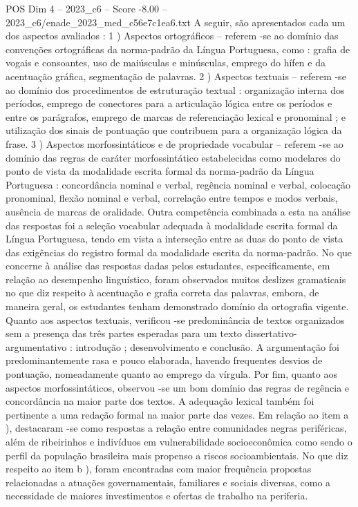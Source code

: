 \begin{textsample}{POS Dim 4 – 2023\_c6 – Score -8.00 – 2023\_c6/enade\_2023\_med\_c56e7c1ea6.txt}
A seguir, são apresentados cada um dos aspectos avaliados : 1 ) Aspectos ortográficos – referem -se ao domínio das convenções ortográficas da norma-padrão da Língua Portuguesa, como : grafia de vogais e consoantes, uso de maiúsculas e minúsculas, emprego do hífen e da acentuação gráfica, segmentação de palavras. 2 ) Aspectos textuais – referem -se ao domínio dos procedimentos de estruturação textual : organização interna dos períodos, emprego de conectores para a articulação lógica entre os períodos e entre os parágrafos, emprego de marcas de referenciação lexical e pronominal ; e utilização dos sinais de pontuação que contribuem para a organização lógica da frase. 3 ) Aspectos morfossintáticos e de propriedade vocabular – referem -se ao domínio das regras de caráter morfossintático estabelecidas como modelares do ponto de vista da modalidade escrita formal da norma-padrão da Língua Portuguesa : concordância nominal e verbal, regência nominal e verbal, colocação pronominal, flexão nominal e verbal, correlação entre tempos e modos verbais, ausência de marcas de oralidade.
Outra competência combinada a esta na análise das respostas foi a seleção vocabular adequada à modalidade escrita formal da Língua Portuguesa, tendo em vista a interseção entre as duas do ponto de vista das exigências do registro formal da modalidade escrita da norma-padrão.
No que concerne à análise das respostas dadas pelos estudantes, especificamente, em relação ao desempenho linguístico, foram observados muitos deslizes gramaticais no que diz respeito à acentuação e grafia correta das palavras, embora, de maneira geral, os estudantes tenham demonstrado domínio da ortografia vigente.
Quanto aos aspectos textuais, verificou -se predominância de textos organizados sem a presença das três partes esperadas para um texto dissertativo-argumentativo : introdução ; desenvolvimento e conclusão.
A argumentação foi predominantemente rasa e pouco elaborada, havendo frequentes desvios de pontuação, nomeadamente quanto ao emprego da vírgula.
Por fim, quanto aos aspectos morfossintáticos, observou -se um bom domínio das regras de regência e concordância na maior parte dos textos.
A adequação lexical também foi pertinente a uma redação formal na maior parte das vezes.
Em relação ao item a ), destacaram -se como respostas a relação entre comunidades negras periféricas, além de ribeirinhos e indivíduos em vulnerabilidade socioeconômica como sendo o perfil da população brasileira mais propenso a riscos socioambientais.
No que diz respeito ao item b ), foram encontradas com maior frequência propostas relacionadas a atuações governamentais, familiares e sociais diversas, como a necessidade de maiores investimentos e ofertas de trabalho na periferia.

\end{textsample}
